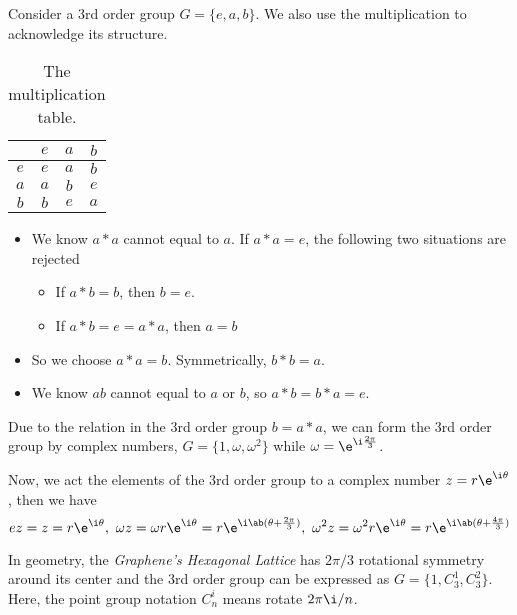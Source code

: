 \begin{example}
    Consider a 3rd order group $G=\{e,a,b\}$. We also use the multiplication  to acknowledge its structure.

    \begin{table}[!ht]
        \begin{minipage}{.32\linewidth}
            \centering
            \caption{The multiplication table.}
            \begin{tabular}{ c | c c c }
                \toprule
                    & $e$ & $a$ & $b$\\
                \midrule
                $e$ & $e$ & $a$ & $b$\\
                $a$ & $a$ & $b$ & $e$\\
                $b$ & $b$ & $e$ & $a$ \\
                \bottomrule
            \end{tabular}
            \label{1.2}
        \end{minipage}
        \hfill
        \begin{minipage}{.64\linewidth}
            \begin{itemize}
                \item We know $a*a$ cannot equal to $a$. If $a*a=e$, the following two situations are rejected
                \begin{itemize}
                    \item If $a*b=b$, then $b=e$.
                    \item If $a*b=e=a*a$, then $a=b$
                \end{itemize}
                \item So we choose $a*a=b$. Symmetrically, $b*b=a$.
                \item We know $ab$ cannot equal to $a$ or $b$, so $a*b=b*a=e$.
            \end{itemize}
        \end{minipage}
    \end{table}

    Due to the relation in the 3rd order group $b=a*a$, we can form the 3rd order group by complex numbers, $G=\{1,\omega,\omega^2\}$ while $\omega=\e^{\i\frac{2\pi}{3}}$.

    Now, we act the elements of the 3rd order group to a complex number $z=r\e^{\i\theta}$, then we have
    \[ez=z=r\e^{\i\theta},\ \omega z=\omega r\e^{\i\theta}=r\e^{\i\ab(\theta+\frac{2\pi}{3})},\ \omega^2z=\omega^2r\e^{\i\theta}=r\e^{\i\ab(\theta+\frac{4\pi}{3})}\]

    In geometry, the \emph{Graphene's Hexagonal Lattice} has $2\pi/3$ rotational symmetry around its center and the 3rd order group can be expressed as $G=\{1,C_3^1,C_3^2\}$. Here, the point group notation $C_n^i$ means rotate $2\pi\i/n$.
\end{example}

